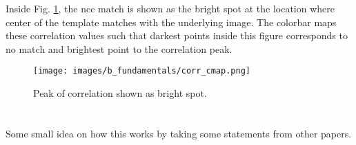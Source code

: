     \noindent Inside Fig. \ref{fig:corr_cmap.png}, the \gls{ncc} match is shown as the bright spot at the location where center of the template matches with the underlying image. The colorbar maps these correlation values such that darkest points inside this figure corresponds to no match and brightest point to the correlation peak.
    
    \begin{figure}[h]
        \hspace{20pt}
        \texttt{[image: images/b\_fundamentals/corr\_cmap.png]}
        \caption{Peak of correlation shown as bright spot.}
        \label{fig:corr_cmap.png}
    \end{figure}

    \section{}
    Some small idea on how this works by taking some statements from other papers.
    
    \clearpage